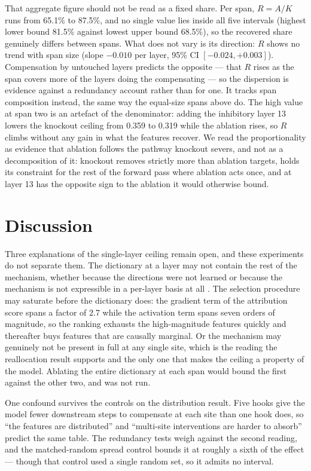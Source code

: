 \documentclass[11pt,a4paper]{article}
\begin{document}
That aggregate figure should not be read as a fixed share. Per span, $R = A/K$
runs from 65.1\% to 87.5\%, and no single value lies inside all five intervals
(highest lower bound 81.5\% against lowest upper bound 68.5\%), so the recovered
share genuinely differs between spans. What does not vary is its direction:
$R$ shows no trend with span size (slope $-0.010$ per layer, 95\% CI
$[-0.024, +0.003]$). Compensation by untouched layers predicts the opposite ---
that $R$ rises as the span covers more of the layers doing the compensating ---
so the dispersion is evidence against a redundancy account rather than for one.
It tracks span composition instead, the same way the equal-size spans above do.
The high value at span two is an artefact of the denominator: adding the
inhibitory layer 13 lowers the knockout ceiling from 0.359 to 0.319 while the
ablation rises, so $R$ climbs without any gain in what the features recover.
We read the proportionality
as evidence that ablation follows the pathway knockout severs, and not as a
decomposition of it: knockout removes strictly more than ablation targets, holds
its constraint for the rest of the forward pass where ablation acts once, and at
layer 13 has the opposite sign to the ablation it would otherwise bound.


\section{Discussion}

Three explanations of the single-layer ceiling remain open, and these
experiments do not separate them. The dictionary at a layer may not contain the
rest of the mechanism, whether because the directions were not learned or
because the mechanism is not expressible in a per-layer basis at all
\citep{yang2026monet,lindsey2025circuittracing}. The selection procedure may saturate before the dictionary does: the gradient
term of the attribution score spans a factor of 2.7 while the activation term
spans seven orders of magnitude, so the ranking exhausts the high-magnitude
features quickly and thereafter buys features that are causally marginal. Or the mechanism may genuinely not be present in full at any
single site, which is the reading the reallocation result supports and the only
one that makes the ceiling a property of the model. Ablating the entire
dictionary at each span would bound the first against the other two, and was not
run.

One confound survives the controls on the distribution result. Five hooks give
the model fewer downstream steps to compensate at each site than one hook does,
so ``the features are distributed'' and ``multi-site interventions are harder to
absorb'' predict the same table. The redundancy tests weigh against the second reading, and the matched-random
spread control bounds it at roughly a sixth of the effect --- though that
control used a single random set, so it admits no interval.
\end{document}
